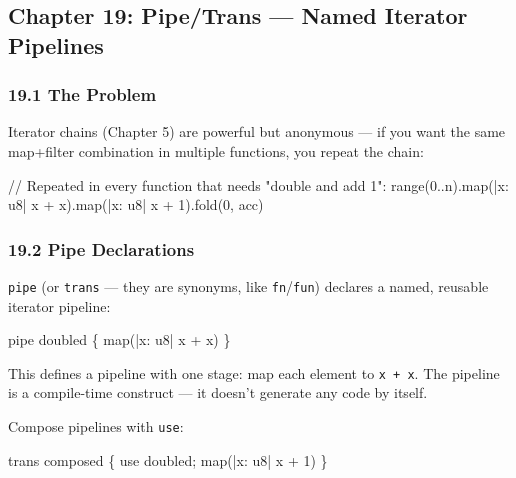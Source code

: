 \documentclass[
  11pt,
]{article}
\newenvironment{Shaded}{\begin{snugshade}}{\end{snugshade}}
\newcommand{\NormalTok}[1]{#1}
\begin{document}
\hypertarget{chapter-19-pipetrans-named-iterator-pipelines}{%
\subsection{Chapter 19: Pipe/Trans --- Named Iterator
Pipelines}\label{chapter-19-pipetrans-named-iterator-pipelines}}

\hypertarget{the-problem}{%
\subsubsection{19.1 The Problem}\label{the-problem}}

Iterator chains (Chapter 5) are powerful but anonymous --- if you want
the same map+filter combination in multiple functions, you repeat the
chain:

\begin{Shaded}
\begin{Highlighting}[]
\NormalTok{// Repeated in every function that needs "double and add 1":}
\NormalTok{range(0..n).map(|x: u8| x + x).map(|x: u8| x + 1).fold(0, acc)}
\end{Highlighting}
\end{Shaded}

\hypertarget{pipe-declarations}{%
\subsubsection{19.2 Pipe Declarations}\label{pipe-declarations}}

\texttt{pipe} (or \texttt{trans} --- they are synonyms, like
\texttt{fn}/\texttt{fun}) declares a named, reusable iterator pipeline:

\begin{Shaded}
\begin{Highlighting}[]
\NormalTok{pipe doubled \{ map(|x: u8| x + x) \}}
\end{Highlighting}
\end{Shaded}

This defines a pipeline with one stage: map each element to
\texttt{x\ +\ x}. The pipeline is a compile-time construct --- it
doesn't generate any code by itself.

Compose pipelines with \texttt{use}:

\begin{Shaded}
\begin{Highlighting}[]
\NormalTok{trans composed \{ use doubled; map(|x: u8| x + 1) \}}
\end{Highlighting}
\end{Shaded}
\end{document}
